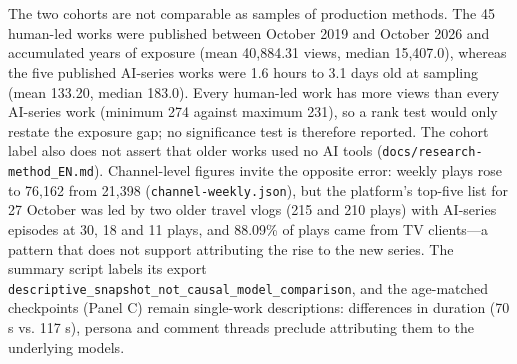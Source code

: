 \documentclass[11pt,a4paper]{article}
\theoremstyle{definition}
\begin{document}
\begin{table}[htbp]
\begin{tabular}
 \\
 \\
\bottomrule
\end{tabular}
\end{table}

The two cohorts are not comparable as samples of production methods. The 45 human-led works were published between October 2019 and October 2026 and accumulated years of exposure (mean 40,884.31 views, median 15,407.0), whereas the five published AI-series works were 1.6 hours to 3.1 days old at sampling (mean 133.20, median 183.0). Every human-led work has more views than every AI-series work (minimum 274 against maximum 231), so a rank test would only restate the exposure gap; no significance test is therefore reported. The cohort label also does not assert that older works used no AI tools (\texttt{docs/\allowbreak{}research-\allowbreak{}method\_\allowbreak{}EN.\allowbreak{}md}). Channel-level figures invite the opposite error: weekly plays rose to 76,162 from 21,398 (\texttt{channel-\allowbreak{}weekly.\allowbreak{}json}), but the platform's top-five list for 27 October was led by two older travel vlogs (215 and 210 plays) with AI-series episodes at 30, 18 and 11 plays, and 88.09\% of plays came from TV clients---a pattern that does not support attributing the rise to the new series. The summary script labels its export \texttt{descriptive\_\allowbreak{}snapshot\_\allowbreak{}not\_\allowbreak{}causal\_\allowbreak{}model\_\allowbreak{}comparison}, and the age-matched checkpoints (Panel C) remain single-work descriptions: differences in duration (70 s vs. 117 s), persona and comment threads preclude attributing them to the underlying models.
\end{document}
